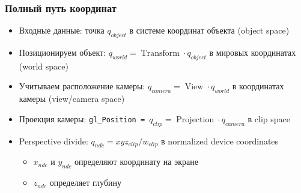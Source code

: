 \documentclass{beamer}
\begin{document}
\begin{frame}[fragile]
\frametitle{Полный путь координат}
\begin{itemize}
\item Входные данные: точка \begin{math}q_{object}\end{math} в системе координат объекта (object space)
\pause
\item Позиционируем объект: \begin{math}q_{world} = \operatorname{Transform} \cdot q_{object}\end{math} в мировых координатах (world space)
\pause
\item Учитываем расположение камеры: \begin{math}q_{camera} = \operatorname{View} \cdot q_{world}\end{math} в координатах камеры (view/camera space)
\pause
\item Проекция камеры: \verb|gl_Position = |\begin{math}q_{clip} = \operatorname{Projection} \cdot q_{camera}\end{math} в clip space
\pause
\item Perspective divide: \begin{math}q_{ndc} = xyz_{clip} / w_{clip}\end{math} в normalized device coordinates
\pause
\begin{itemize}
\item \begin{math}x_{ndc}\end{math} и \begin{math}y_{ndc}\end{math} определяют координату на экране
\item \begin{math}z_{ndc}\end{math} определяет глубину
\end{itemize}
\end{itemize}
\end{frame}
\end{document}
